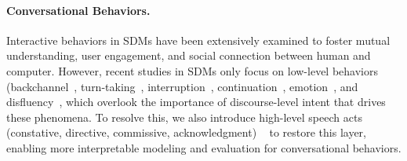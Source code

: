 \paragraph{Conversational Behaviors.}
Interactive behaviors in SDMs have been extensively examined to foster mutual understanding, user engagement, and social connection between human and computer. However, recent studies in SDMs only focus on low-level behaviors (backchannel~\citep{schegloff1982discourse, arvix:2507.23159, arxiv:2503.04721}, turn-taking~\citep{gravano2011turn, duncan1972some, raux2012optimizing}, interruption~\citep{khouzaimi2016reinforcement, marge2022spoken},  continuation~\citep{arvix:2507.23159, arxiv:2503.04721, arora2025talking, nguyen2023generative}, emotion~\citep{arxiv:2508.17623, arvix:2510.07355}, and disfluency~\citep{lian-anumanchipalli-2024-towards-hudm,lian2023unconstrained-udm,ssdm,lian2024ssdm2.0}, which overlook the importance of discourse-level intent that drives these phenomena. To resolve this, we also introduce high-level speech acts (constative, directive, commissive, acknowledgment) ~\citep{jurafsky2025speech} to restore this layer, enabling more interpretable modeling and evaluation for conversational behaviors.

